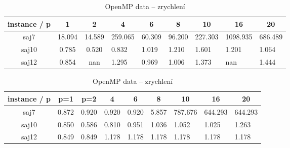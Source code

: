 \documentclass{article}
\begin{document}
    \begin{table}[h]
        \begin{subtable}{.5\linewidth}\centering
        \begin{tabular}{|c|c|c|l|l|l|l|l|l|}
            \hline
            \textbf{instance / p} &
            \textbf{1} &
            \textbf{2} &
            \multicolumn{1}{c|}{\textbf{4}} &
            \multicolumn{1}{c|}{\textbf{6}} &
            \multicolumn{1}{c|}{\textbf{8}} &
            \multicolumn{1}{c|}{\textbf{10}} &
            \multicolumn{1}{c|}{\textbf{16}} &
            \multicolumn{1}{c|}{\textbf{20}} \\ \hline
            saj7 &
                {\color[HTML]{FE0000} 18.094} &
                {\color[HTML]{FE0000} 14.589} &
                {\color[HTML]{FE0000} 259.065} &
                {\color[HTML]{FE0000} 60.309} &
                {\color[HTML]{FE0000} 96.200} &
                {\color[HTML]{FE0000} 227.303} &
                {\color[HTML]{FE0000} 1098.935} &
                {\color[HTML]{FE0000} 686.489} \\ \hline
            saj10 & 0.785 & 0.520 & 0.832 & 1.019 & 1.210 & 1.601 & 1.201 & 1.064 \\ \hline
            saj12 & 0.854 & nan   & 1.295 & 0.969 & 1.006 & 1.373 & nan   & 1.444 \\ \hline
        \end{tabular}
        \caption{OpenMP task -- zrychlení} \label{tab:speedup-openmp-task}
        \end{subtable}%
        \bigskip
        \bigskip

        \begin{subtable}{.5\linewidth}\centering
        \begin{tabular}{|c|c|c|l|l|l|l|l|l|}
            \hline
            \textbf{instance / p} &
            \textbf{p=1} &
            \textbf{p=2} &
            \multicolumn{1}{c|}{\textbf{4}} &
            \multicolumn{1}{c|}{\textbf{6}} &
            \multicolumn{1}{c|}{\textbf{8}} &
            \multicolumn{1}{c|}{\textbf{10}} &
            \multicolumn{1}{c|}{\textbf{16}} &
            \multicolumn{1}{c|}{\textbf{20}} \\ \hline
            saj7  & 0.872 & 0.920 & 0.920 & 0.920 & 5.857 & {\color[HTML]{FE0000} 787.676} & {\color[HTML]{FE0000} 644.293} & {\color[HTML]{FE0000} 644.293} \\ \hline
            saj10 & 0.850 & 0.586 & 0.810 & 0.951 & 1.036 & 1.052                          & 1.025                          & 1.263                          \\ \hline
            saj12 & 0.849 & 0.849 & 1.178 & 1.178 & 1.178 & 1.178                          & 1.178                          & 1.178                          \\ \hline
        \end{tabular}
        \caption{OpenMP data -- zrychlení} \label{tab:speedup-openmp-data}
        \end{subtable}%
        \bigskip
        \bigskip


\end{table}
\end{document}
